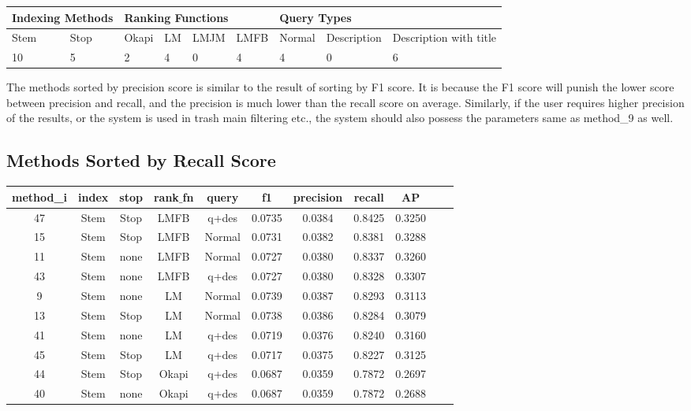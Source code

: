\documentclass[10pt, a4paper]{article}
\begin{document}
\begin{center}
\begin{tabular}{|l|l|l|l|l|l|l|l|l|}
\hline
\multicolumn{2}{|l|}{Indexing Methods} & \multicolumn{4}{l|}{Ranking Functions} & \multicolumn{3}{l|}{Query Types}              \\ \hline
Stem               & Stop              & Okapi     & LM     & LMJM    & LMFB    & Normal & Description & Description with title \\ \hline
10                  & 5                 & 2         & 4      & 0       & 4       & 4      & 0           & 6                      \\ \hline
\end{tabular}
\end{center}

The methods sorted by precision score is similar to the result of sorting by F1 score. It is because the F1 score will punish the lower score between precision and recall, and the precision is much lower than the recall score on average. Similarly, if the user requires higher precision of the results, or the system is used in trash main filtering etc., the system should also possess the parameters same as method_9 as well.

\subsection{Methods Sorted by Recall Score}
\begin{center}
\begin{tabular}{ |c|c|c|c|c|c|c|c|c|c|c| } 
\hline
method_i  & index & stop & rank$\_$fn & query & f1 & precision & recall & AP \\
\hline
 47 & Stem & Stop & LMFB &  q+des & 0.0735 &  0.0384 & 0.8425 & 0.3250 \\
 15 & Stem & Stop & LMFB & Normal & 0.0731 &  0.0382 & 0.8381 & 0.3288 \\
 11 & Stem & none & LMFB & Normal & 0.0727 &  0.0380 & 0.8337 & 0.3260 \\
 43 & Stem & none & LMFB &  q+des & 0.0727 &  0.0380 & 0.8328 & 0.3307 \\
9 & Stem & none & LM & Normal & 0.0739 &  0.0387 & 0.8293 & 0.3113 \\
 13 & Stem & Stop & LM & Normal & 0.0738 &  0.0386 & 0.8284 & 0.3079 \\
 41 & Stem & none & LM &  q+des & 0.0719 &  0.0376 & 0.8240 & 0.3160 \\
 45 & Stem & Stop & LM &  q+des & 0.0717 &  0.0375 & 0.8227 & 0.3125 \\
 44 & Stem & Stop &  Okapi &  q+des & 0.0687 &  0.0359 & 0.7872 & 0.2697 \\
 40 & Stem & none &  Okapi &  q+des & 0.0687 &  0.0359 & 0.7872 & 0.2688 \\
\hline
\end{tabular}
\end{center}
\end{document}
